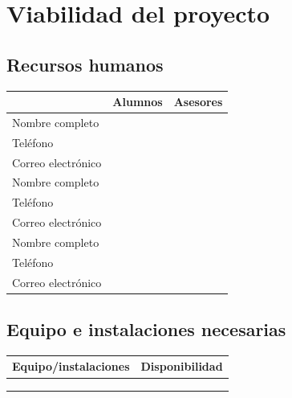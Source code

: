 \chapter{Viabilidad del proyecto}\label{Cap7}
\section{Recursos humanos}
\begin{center}
\begin{tabular}{|l|p{6cm}|p{6cm}|}
\hline
\rowcolor{gray}     & \textbf{Alumnos} & \textbf{Asesores} \\\hline\hline
Nombre completo    &    &    \\\hline
Teléfono    &    &    \\\hline
Correo electrónico    &    &    \\ \hline
Nombre completo    &    &    \\\hline
Teléfono    &    &    \\\hline
Correo electrónico    &    &    \\ \hline
Nombre completo    &    &    \\\hline
Teléfono    &    &    \\\hline
Correo electrónico    &    &  \\\hline  
\end{tabular}
\end{center}

\section{Equipo e instalaciones necesarias}
\begin{center}
\begin{tabular}{|p{6cm}|p{6cm}|}
\hline
\rowcolor{gray}  \textbf{Equipo/instalaciones}   & \textbf{Disponibilidad} \\\hline\hline
     & \\\hline
     & \\\hline
     & \\\hline
\end{tabular}
\end{center}

